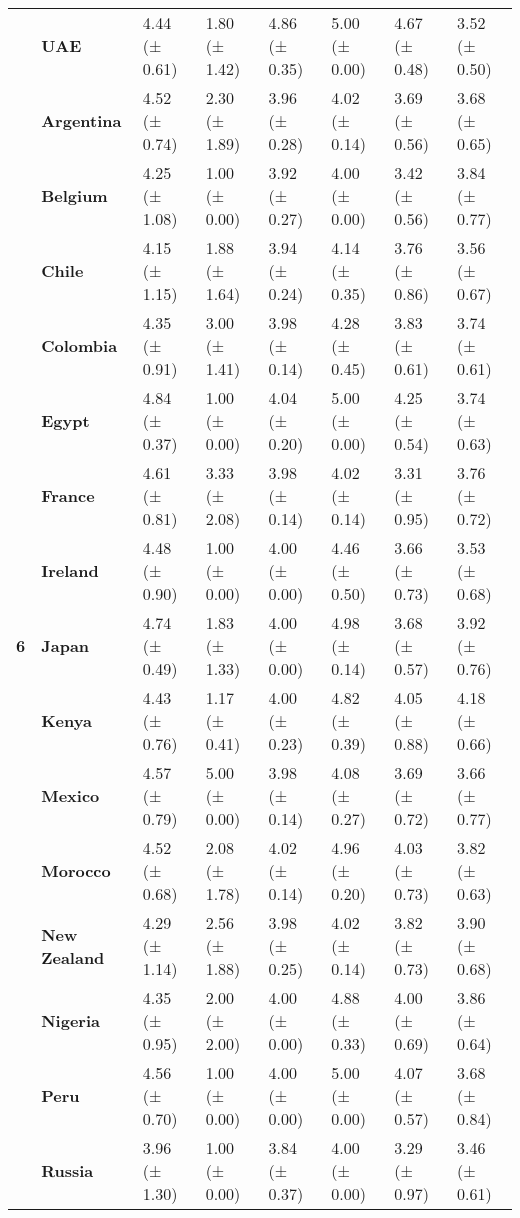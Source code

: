 \begin{tabular}{llllllll}
\textbf{} & \textbf{UAE} & 4.44 (± 0.61) & 1.80 (± 1.42) & 4.86 (± 0.35) & 5.00 (± 0.00) & 4.67 (± 0.48) & 3.52 (± 0.50) \\
\cline{1-8}
\multirow[t]{19}{*}{\textbf{6}} & \textbf{Argentina} & 4.52 (± 0.74) & 2.30 (± 1.89) & 3.96 (± 0.28) & 4.02 (± 0.14) & 3.69 (± 0.56) & 3.68 (± 0.65) \\
\textbf{} & \textbf{Belgium} & 4.25 (± 1.08) & 1.00 (± 0.00) & 3.92 (± 0.27) & 4.00 (± 0.00) & 3.42 (± 0.56) & 3.84 (± 0.77) \\
\textbf{} & \textbf{Chile} & 4.15 (± 1.15) & 1.88 (± 1.64) & 3.94 (± 0.24) & 4.14 (± 0.35) & 3.76 (± 0.86) & 3.56 (± 0.67) \\
\textbf{} & \textbf{Colombia} & 4.35 (± 0.91) & 3.00 (± 1.41) & 3.98 (± 0.14) & 4.28 (± 0.45) & 3.83 (± 0.61) & 3.74 (± 0.61) \\
\textbf{} & \textbf{Egypt} & 4.84 (± 0.37) & 1.00 (± 0.00) & 4.04 (± 0.20) & 5.00 (± 0.00) & 4.25 (± 0.54) & 3.74 (± 0.63) \\
\textbf{} & \textbf{France} & 4.61 (± 0.81) & 3.33 (± 2.08) & 3.98 (± 0.14) & 4.02 (± 0.14) & 3.31 (± 0.95) & 3.76 (± 0.72) \\
\textbf{} & \textbf{Ireland} & 4.48 (± 0.90) & 1.00 (± 0.00) & 4.00 (± 0.00) & 4.46 (± 0.50) & 3.66 (± 0.73) & 3.53 (± 0.68) \\
\textbf{} & \textbf{Japan} & 4.74 (± 0.49) & 1.83 (± 1.33) & 4.00 (± 0.00) & 4.98 (± 0.14) & 3.68 (± 0.57) & 3.92 (± 0.76) \\
\textbf{} & \textbf{Kenya} & 4.43 (± 0.76) & 1.17 (± 0.41) & 4.00 (± 0.23) & 4.82 (± 0.39) & 4.05 (± 0.88) & 4.18 (± 0.66) \\
\textbf{} & \textbf{Mexico} & 4.57 (± 0.79) & 5.00 (± 0.00) & 3.98 (± 0.14) & 4.08 (± 0.27) & 3.69 (± 0.72) & 3.66 (± 0.77) \\
\textbf{} & \textbf{Morocco} & 4.52 (± 0.68) & 2.08 (± 1.78) & 4.02 (± 0.14) & 4.96 (± 0.20) & 4.03 (± 0.73) & 3.82 (± 0.63) \\
\textbf{} & \textbf{New Zealand} & 4.29 (± 1.14) & 2.56 (± 1.88) & 3.98 (± 0.25) & 4.02 (± 0.14) & 3.82 (± 0.73) & 3.90 (± 0.68) \\
\textbf{} & \textbf{Nigeria} & 4.35 (± 0.95) & 2.00 (± 2.00) & 4.00 (± 0.00) & 4.88 (± 0.33) & 4.00 (± 0.69) & 3.86 (± 0.64) \\
\textbf{} & \textbf{Peru} & 4.56 (± 0.70) & 1.00 (± 0.00) & 4.00 (± 0.00) & 5.00 (± 0.00) & 4.07 (± 0.57) & 3.68 (± 0.84) \\
\textbf{} & \textbf{Russia} & 3.96 (± 1.30) & 1.00 (± 0.00) & 3.84 (± 0.37) & 4.00 (± 0.00) & 3.29 (± 0.97) & 3.46 (± 0.61) \\

\end{tabular}
